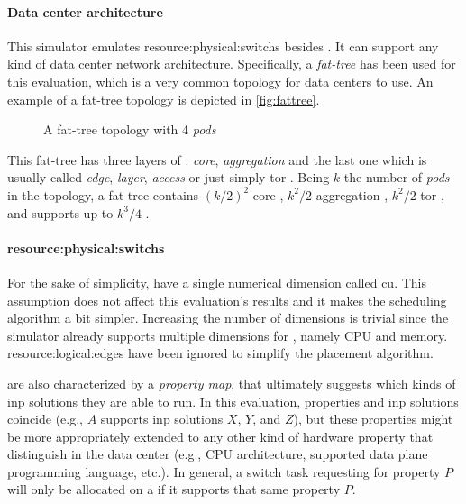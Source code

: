 \paragraph{Data center architecture}
This simulator emulates \glspl{resource:physical:switch} besides .
It can support any kind of data center network architecture.
Specifically, a \textit{fat-tree} has been used for this evaluation, which is a very common topology for data centers to use. An example of a fat-tree topology is depicted in \autoref{fig:fattree}.
\begin{figure}[!htb]
    \centering
    \usebox{\fattree}
    \caption{A fat-tree topology with 4 \textit{pods}}
    \label{fig:fattree}
\end{figure}

This fat-tree has three layers of : \textit{core}, \textit{aggregation} and the last one which is usually called \textit{edge}, \textit{layer}, \textit{access} or just simply \gls{tor} .
Being $k$ the number of \textit{pods} in the topology, a fat-tree contains $(k/2)^2$ core , $k^2/2$ aggregation , $k^2/2$ \gls{tor} , and supports up to $k^3/4$ .

\paragraph{\Glspl{resource:physical:switch}} \label{simulator_switch_resources}
For the sake of simplicity,  have a single numerical dimension called \gls{cu}.
This assumption does not affect this evaluation's results and it makes the scheduling algorithm a bit simpler.
Increasing the number of  dimensions is trivial since the simulator already supports multiple dimensions for , namely CPU and memory.
\Glspl{resource:logical:edge} have been ignored to simplify the placement algorithm.

 are also characterized by a \textit{property map}, that ultimately suggests which kinds of \gls{inp} solutions they are able to run.
In this evaluation, properties and \gls{inp} solutions coincide (e.g.,  $A$ supports \gls{inp} solutions $X$, $Y$, and $Z$), but these properties might be more appropriately extended to any other kind of hardware property that distinguish  in the data center (e.g., CPU architecture, supported data plane programming language, etc.).
In general, a switch task requesting for property $P$ will only be allocated on a  if it supports that same property $P$.